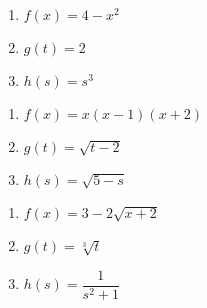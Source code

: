 \documentclass{ximera}
\begin{document}
\begin{multicols}{3}
\begin{enumerate}
\setcounter{enumi}{\value{HW}}

\item $f(x) = 4-x^2$
\item $g(t) = 2$
\item $h(s) = s^3$

\setcounter{HW}{\value{enumi}}
\end{enumerate}
\end{multicols}

\begin{multicols}{3}
\begin{enumerate}
\setcounter{enumi}{\value{HW}}

\item $f(x) = x(x-1)(x+2)$
\item $g(t) = \sqrt{t-2}$
\item $h(s) = \sqrt{5 - s}$

\setcounter{HW}{\value{enumi}}
\end{enumerate}
\end{multicols}

\begin{multicols}{3}
\begin{enumerate}
\setcounter{enumi}{\value{HW}}

\item $f(x) = 3-2\sqrt{x+2}$
\item $g(t) = \sqrt[3]{t}$
\item $h(s) = \dfrac{1}{s^{2} + 1}$ \label{sketchgraphlast}

\setcounter{HW}{\value{enumi}}
\end{enumerate}
\end{multicols}
\end{document}
